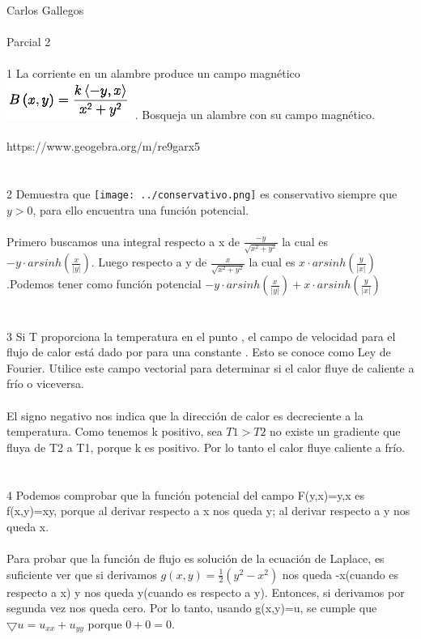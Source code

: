 \documentclass[a4paper,10pt]{article}
\title{}
\author{}
\date{}
\begin{document}
\maketitle
Carlos Gallegos\\\\
Parcial 2 \\\\
1 La corriente en un alambre produce un campo magnético \includegraphics[scale=.4]{../campo eléctrico.png}   . Bosqueja un alambre con su campo magnético.\\\\
https://www.geogebra.org/m/re9garx5\\\\\\
2 Demuestra que \texttt{[image: ../conservativo.png]}  es conservativo siempre que $y>0$, para ello encuentra una función potencial.\\\\
Primero buscamos una integral respecto a x de $\frac{-y}{\sqrt{x^2 + y^2}}$ la cual es $-y\cdot arsinh(\frac{x}{|y|})$. Luego respecto a y de $\frac{x}{\sqrt{x^2 + y^2}}$ la cual es $x\cdot arsinh(\frac{y}{|x|})$.Podemos tener como función potencial $-y\cdot arsinh(\frac{x}{|y|}) + x\cdot arsinh(\frac{y}{|x|})$\\\\\\
3 Si T proporciona la temperatura en el punto , el campo de velocidad para el flujo de calor está dado por  para una constante . Esto se conoce como Ley de Fourier. Utilice este campo vectorial para determinar si el calor fluye de caliente a frío o viceversa. \\\\
El signo negativo nos indica que la dirección de calor es decreciente a la temperatura. Como tenemos k positivo, sea $T1>T2$ no existe un gradiente que fluya de T2 a T1, porque k es positivo. Por lo tanto el calor fluye caliente a frío.\\\\\\
4 Podemos comprobar que la función potencial del campo F(y,x)=y,x es f(x,y)=xy, porque al derivar respecto a x nos queda y; al derivar respecto a y nos queda x.\\\\
Para probar que la función de flujo es solución de la ecuación de Laplace, es suficiente ver que si derivamos $g(x,y)= \frac{1}{2}(y^2 -x^2)$ nos queda -x(cuando es respecto a x) y nos queda y(cuando es respecto a y). Entonces, si derivamos por segunda vez nos queda cero. Por lo tanto, usando g(x,y)=u, se cumple que $\bigtriangledown u= u_{xx} + u_{yy}$ porque $0+0=0$.\\\\\\
\end{document}
